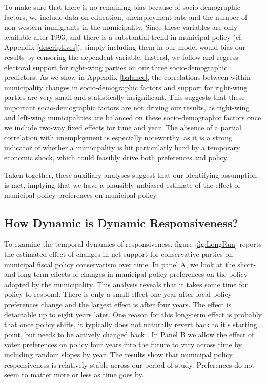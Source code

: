 \documentclass[a4paper,12pt]{article}
\begin{document}
To make sure that there is no remaining bias because of socio-demographic factors, we include data on education, unemployment rate and the number of non-western immigrants in the municipality. Since these variables are only available after 1993, and there is a substantial trend in municipal policy (cf. Appendix \ref{descriptives}), simply including them in our model would bias our results by censoring the dependent variable. Instead, we follow \citep{pei2018poorly} and regress electoral support for right-wing parties on our three socio-demographic predictors. As we show in Appendix \ref{balance}, the correlations between within-municipality changes in socio-demographic factors and support for right-wing parties are very small and statistically insignificant. This suggests that these important socio-demographic factors are not driving our results, as right-wing and left-wing municipalities are balanced on these socio-demographic factors once we include two-way fixed effects for time and year. The absence of a partial correlation with unemployment is especially noteworthy, as it is a strong indicator of whether a municipality is hit particularly hard by a temporary economic shock, which could feasibly drive both preferences and policy.

Taken together, these auxiliary analyses suggest that our identifying assumption is met, implying that we have a plausibly unbiased estimate of the effect of municipal policy preferences on municipal policy.

\subsection*{How Dynamic is Dynamic Responsiveness?}

To examine the temporal dynamics of responsiveness, figure \ref{fig:LongRun} reports the estimated effect of changes in net support for conservative parties on municipal fiscal policy conservatism over time. In panel A, we look at the short- and long-term effects of changes in municipal policy preferences on the policy adopted by the municipality. This analysis reveals that it takes some time for policy to respond. There is only a small effect one year after local policy preferences change and the largest effect is after four years. The effect is detactable up to eight years later. One reason for this long-term effect is probably that once policy shifts, it typically does not naturally revert back to it's starting point, but needs to be actively changed back \citep[e.g.,][]{baumgartner2009punctuated}. In Panel B we allow the effect of voter preferences on policy four years into the future to vary across time by including random slopes by year. The results show that municipal policy responsiveness is relatively stable across our period of study. Preferences do not seem to matter more or less as time goes by.
\end{document}
